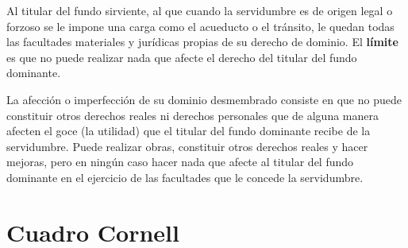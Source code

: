 \documentclass[12pt,oneside]{book}
\begin{document}
Al titular del fundo sirviente, al que cuando la servidumbre es de origen legal o forzoso se le impone una carga como el acueducto o el tránsito, le quedan todas las facultades materiales y jurídicas propias de su derecho de dominio. El \textbf{límite} es que no puede realizar nada que afecte el derecho del titular del fundo dominante.

La afección o imperfección de su dominio desmembrado consiste en que no puede constituir otros derechos reales ni derechos personales que de alguna manera afecten el goce (la utilidad) que el titular del fundo dominante recibe de la servidumbre. Puede realizar obras, constituir otros derechos reales y hacer mejoras, pero en ningún caso hacer nada que afecte al titular del fundo dominante en el ejercicio de las facultades que le concede la servidumbre.

\section{Cuadro Cornell}
\end{document}
